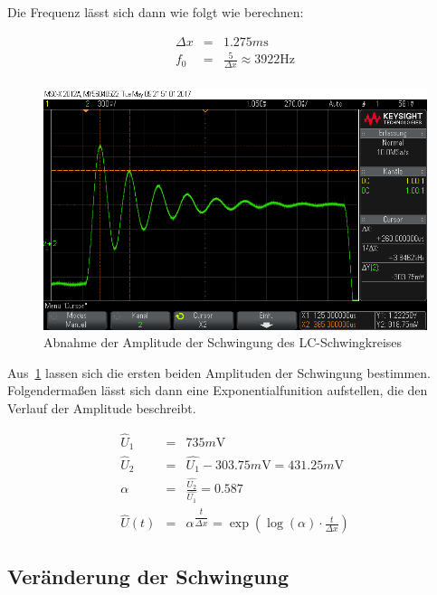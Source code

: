 \documentclass[10pt]{scrreprt}
\begin{document}
            Die Frequenz lässt sich dann wie folgt wie berechnen:
        \begin{center}
            \begin{eqnarray}
                \Delta x &=& 1.275 \si{m \second}\\
                f_0 &=& \frac{5}{\Delta x} \approx 3922\si{\hertz}\\
            \end{eqnarray}
            \begin{figure}[H]
                \includegraphics[width=\textwidth]{scope_13.png}
                \caption{Abnahme der Amplitude der Schwingung des LC-Schwingkreises}
                \label{fig:SpanAbn}
            \end{figure}
        \end{center}

        Aus~\ref{fig:SpanAbn} lassen sich die ersten beiden Amplituden der Schwingung
        bestimmen. Folgendermaßen lässt sich dann eine Exponentialfunition aufstellen,
        die den Verlauf der Amplitude beschreibt.

        \begin{eqnarray}
            \hat{U}_1 &=& 735\si{m\volt}\\
            \hat{U}_2 &=& \hat{U_1} - 303.75\si{m\volt} = 431.25\si{m\volt}\\
            \alpha &=& \frac{\hat{U_2}}{\hat{U_1}} = 0.587\\
            \hat{U}(t) &=& \alpha^{\dfrac{t}{\Delta x}} = \exp{(\log{(\alpha)} \cdot \frac{t}{\Delta x})}
        \end{eqnarray}

        \subsection{Veränderung der Schwingung}
\end{document}
